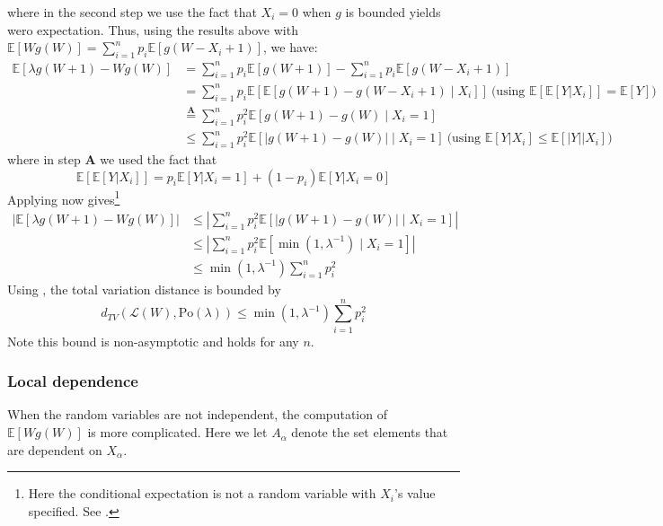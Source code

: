 \documentclass{article}
\begin{document}
    where in the second step we use the fact that $X_i=0$ when $g$ is bounded yields wero expectation. Thus, using the results above with $\mathbb{E}[Wg(W)] =  \sum_{i=1}^n p_i \mathbb{E}[g(W - X_i + 1)]$, we have:  
    \begin{align*}
        \mathbb{E}[\lambda g(W+1) - Wg(W)] &= \sum_{i=1}^n p_i \mathbb{E}[g(W + 1)] - \sum_{i=1}^n p_i \mathbb{E}[g(W - X_i + 1)]\\
        &= \sum_{i=1}^n p_i \mathbb{E}[\mathbb{E}[g(W+1) - g(W - X_i + 1) \mid X_i]] \ \text{(using $\mathbb{E}[\mathbb{E}[Y|X_i]]=\mathbb{E}[Y]$)}\\
        &\stackrel{\textbf{A}}{=} \sum_{i=1}^n p_i^2 \mathbb{E}[g(W+1) - g(W) \mid X_i=1] \\
        & \leq \sum_{i=1}^n p_i^2 \mathbb{E}[|g(W+1) - g(W)| \mid X_i=1] \ \text{(using $\mathbb{E}[Y|X_i]\leq\mathbb{E}[|Y||X_i]$)}
    \end{align*}
    where  in step $\textbf{A}$ we used the fact that 
    \[
    \mathbb{E}[\mathbb{E}[Y|X_i]]=p_i \mathbb{E}[Y|X_i=1] + (1-p_i) \mathbb{E}[Y|X_i=0]
    \]
    Applying  now gives\footnote{Here the conditional expectation is not a random variable with $X_i$'s value specified. See \citep{durrett2010probability}.}
    \begin{align*}
        |\mathbb{E}[\lambda g(W+1) - Wg(W)]| &\leq \left|\sum_{i=1}^n p_i^2 \mathbb{E}[|g(W+1) - g(W)| \mid X_i=1]\right|\\
        &\leq \left|\sum_{i=1}^n p_i^2 \mathbb{E}[\min (1, \lambda^{-1})\mid X_i=1]\right|\\
        &\leq \min (1, \lambda^{-1}) \sum_{i=1}^n p_i^2
    \end{align*}
    Using , the total variation distance is bounded by
    \begin{equation*}
        d_{TV}(\mathcal{L}(W), \text{Po}(\lambda)) \leq \min (1, \lambda^{-1}) \sum_{i=1}^n p_i^2
    \end{equation*}
    Note this bound is non-asymptotic and holds for any $n$.

\subsubsection{Local dependence}  
When the random variables are not independent, the computation of $\mathbb{E}[Wg(W)]$ is more complicated.  Here we let $A_\alpha$ denote the set elements that are dependent on $X_\alpha$.  
\end{document}
